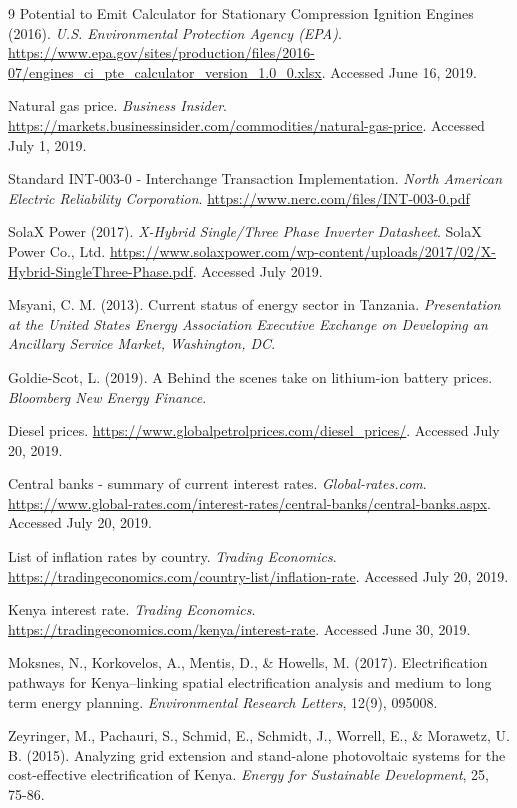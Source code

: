 \documentclass[final,3p,times]{elsarticle}
\begin{document}
\begin{thebibliography}{9}
Potential to Emit Calculator for Stationary Compression Ignition Engines (2016). \textit{U.S. Environmental Protection Agency (EPA)}.
\url{https://www.epa.gov/sites/production/files/2016-07/engines_ci_pte_calculator_version_1.0_0.xlsx}. Accessed June 16, 2019. 

Natural gas price. \textit{Business Insider}. \url{https://markets.businessinsider.com/commodities/natural-gas-price}. Accessed July 1, 2019. 

Standard INT-003-0 - Interchange Transaction Implementation. \textit{North American Electric Reliability Corporation}.
\url{https://www.nerc.com/files/INT-003-0.pdf}

SolaX Power (2017). \textit{X-Hybrid Single/Three Phase Inverter Datasheet}. SolaX Power Co., Ltd. \url{https://www.solaxpower.com/wp-content/uploads/2017/02/X-Hybrid-SingleThree-Phase.pdf}. Accessed July 2019.

Msyani, C. M. (2013). Current status of energy sector in Tanzania. \textit{Presentation at the United States Energy Association Executive Exchange on Developing an Ancillary Service Market, Washington, DC}.

Goldie-Scot, L. (2019). A Behind the scenes take on lithium-ion battery prices. \textit{Bloomberg New Energy Finance}.

Diesel prices. \url{https://www.globalpetrolprices.com/diesel_prices/}. Accessed July 20, 2019. 

Central banks - summary of current interest rates. \textit{Global-rates.com}. \url{https://www.global-rates.com/interest-rates/central-banks/central-banks.aspx}. Accessed July 20, 2019.

List of inflation rates by country. \textit{Trading Economics}.
\url{https://tradingeconomics.com/country-list/inflation-rate}. Accessed July 20, 2019.

Kenya interest rate. \textit{Trading Economics}. \url{https://tradingeconomics.com/kenya/interest-rate}. Accessed June 30, 2019.

Moksnes, N., Korkovelos, A., Mentis, D., \& Howells, M. (2017). Electrification pathways for Kenya–linking spatial electrification analysis and medium to long term energy planning. \textit{Environmental Research Letters}, 12(9), 095008.

Zeyringer, M., Pachauri, S., Schmid, E., Schmidt, J., Worrell, E., \& Morawetz, U. B. (2015). Analyzing grid extension and stand-alone photovoltaic systems for the cost-effective electrification of Kenya. \textit{Energy for Sustainable Development}, 25, 75-86.


\end{thebibliography}
\end{document}

